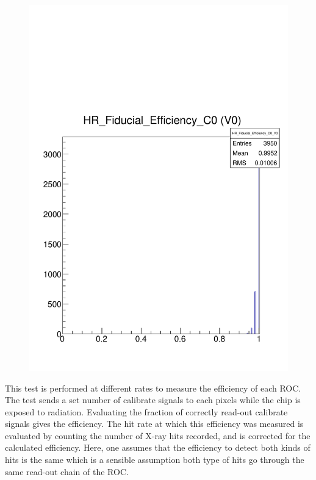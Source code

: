\documentclass[a4paper,12pt,twoside]{article}
\begin{document}
\begin{figure} [h!]
\begin{minipage}{.48\textwidth}
  \includegraphics[width=\textwidth]{./Figures/Efficiency_Fiducial.pdf}
  \label{Efficiency-Fiducial}
\end{minipage}
\end{figure}

This test is performed at different rates to measure the efficiency of each ROC. The test sends a set number of calibrate signals to each pixels while the chip is exposed to radiation. Evaluating the fraction of correctly read-out calibrate signals gives the efficiency. The hit rate at which this efficiency was measured is evaluated by counting the number of X-ray hits recorded, and is corrected for the calculated efficiency. Here, one assumes that the efficiency to detect both kinds of hits is the same which is a sensible assumption both type of hits go through the same read-out chain of the ROC.
\end{document}
